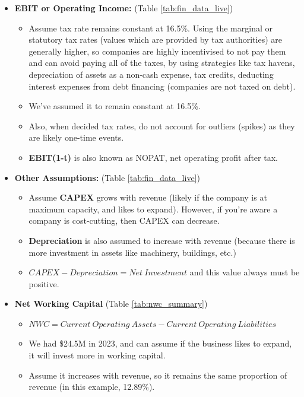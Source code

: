 \begin{itemize}
\begin{itemize}
        \end{itemize}
    \item \textbf{EBIT or Operating Income: } (Table \ref{tab:fin_data_live})
    \begin{itemize}
        \item Assume tax rate remains constant at 16.5\%. Using the marginal or statutory tax rates (values which are provided by tax authorities) are generally higher, so companies are highly incentivised to not pay them and can avoid paying all of the taxes, by using strategies like tax havens, depreciation of assets as a non-cash expense, tax credits, deducting interest expenses from debt financing (companies are not taxed on debt).
        \item We've assumed it to remain constant at 16.5\%. 
        \item Also, when decided tax rates, do not account for outliers (spikes) as they are likely one-time events.
        \item \textbf{EBIT(1-t)} is also known as NOPAT, net operating profit after tax.  
    \end{itemize}
    \item \textbf{Other Assumptions: } (Table \ref{tab:fin_data_live})    
    \begin{itemize}
            \item Assume \textbf{CAPEX} grows with revenue (likely if the company is at maximum capacity, and likes to expand). However, if you're aware a company is cost-cutting, then CAPEX can decrease.
            \item \textbf{Depreciation} is also assumed to increase with revenue (because there is more investment in assets like machinery, buildings, etc.)
            \item $CAPEX - Depreciation = Net \ Investment$ and this value always must be positive.
        \end{itemize}
    \item \textbf{Net Working Capital} (Table \ref{tab:nwc_summary})    
    \begin{itemize}
        \item $NWC = Current \ Operating \ Assets - Current \ Operating \ Liabilities $
        \item We had \$24.5M in 2023, and can assume if the business likes to expand, it will invest more in working capital.
        \item Assume it increases with revenue, so it remains the same proportion of revenue (in this example, 12.89\%).

\end{itemize}
\end{itemize}
